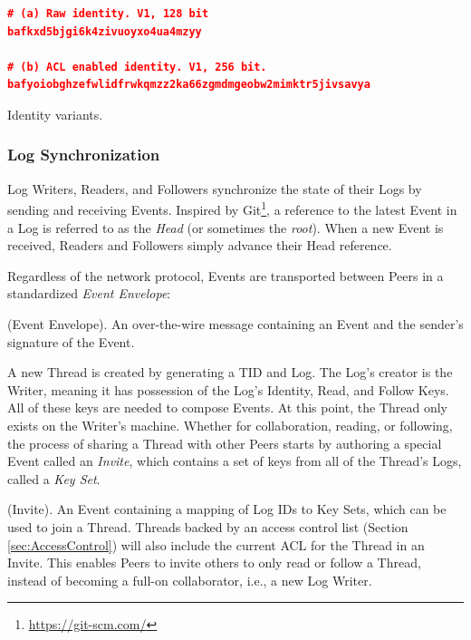 \documentclass{textile}
\begin{document}
\begin{example*}[!b]
\centering
\begin{minipage}{0.6\textwidth}
\begin{lstlisting}[language=json,firstnumber=1]
# (a) Raw identity. V1, 128 bit
bafkxd5bjgi6k4zivuoyxo4ua4mzyy

# (b) ACL enabled identity. V1, 256 bit.
bafyoiobghzefwlidfrwkqmzz2ka66zgmdmgeobw2mimktr5jivsavya
\end{lstlisting}
\end{minipage}
  \caption{Identity variants.}
  \label{ex:Identity}
\end{example*}

\subsubsection{Log Synchronization} \label{sec:LogSync}

Log Writers, Readers, and Followers synchronize the state of their Logs by sending and receiving Events. Inspired by Git\footnote{\url{https://git-scm.com/}}, a reference to the latest Event in a Log is referred to as the \emph{Head} (or sometimes the \emph{root}). When a new Event is received, Readers and Followers simply advance their Head reference.

Regardless of the network protocol, Events are transported between Peers in a standardized \emph{Event Envelope}:

\begin{definition}
(Event Envelope). An over-the-wire message containing an Event and the sender's signature of the Event.
\end{definition}

A new Thread is created by generating a TID and Log. The Log's creator is the Writer, meaning it has possession of the Log's Identity, Read, and Follow Keys. All of these keys are needed to compose Events. At this point, the Thread only exists on the Writer's machine. Whether for collaboration, reading, or following, the process of sharing a Thread with other Peers starts by authoring a special Event called an \emph{Invite}, which contains a set of keys from all of the Thread's Logs, called a \emph{Key Set}.

\begin{definition}
(Invite). An Event containing a mapping of Log IDs to Key Sets, which can be used to join a Thread. Threads backed by an access control list (Section  \ref{sec:AccessControl}) will also include the current ACL for the Thread in an Invite. This enables Peers to invite others to only read or follow a Thread, instead of becoming a full-on collaborator, i.e., a new Log Writer.
\end{definition}
\end{document}
